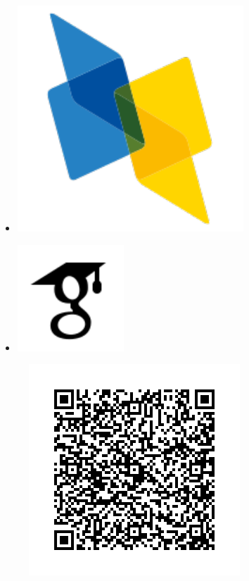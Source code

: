 \documentclass[a4paper,oneside,10pt]{article}
\begin{document}
\begin{multicols}{9}
\begin{itemize}
\item[]\href{https://dblp.uni-trier.de/pers/hd/a/Angelidis:Iosif}{\includegraphics[scale=0.15]{assets/dblp.pdf}}

\item[]\href{https://scholar.google.gr/citations?user=r8jJLocAAAAJ&hl=en}{\includegraphics[scale=0.3]{assets/icons8-google-scholar.pdf}}

\end{itemize}
\end{multicols}

\begin{figure}[hbt!]
	\centering
	\includegraphics[scale=0.315]{qrcode.png}%
\end{figure}
\end{document}
